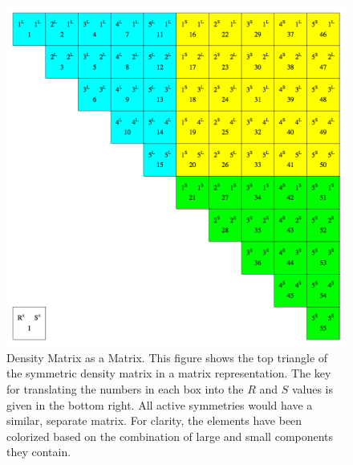 \documentclass[12pt]{report}
\begin{document}
\begin{figure}
\includegraphics[width=1\textwidth]{Figures/dtmx_mat.png}
\caption[Density Matrix as a Matrix]
{Density Matrix as a Matrix. This figure shows the top triangle of the symmetric density matrix in a matrix representation. The key for translating the numbers in each box into the $R$ and $S$ values is given in the bottom right. All active symmetries would have a similar, separate matrix. For clarity, the elements have been colorized based on the combination of large and small components they contain.}
\label{fig:dtmxmat}
\end{figure}
\end{document}
